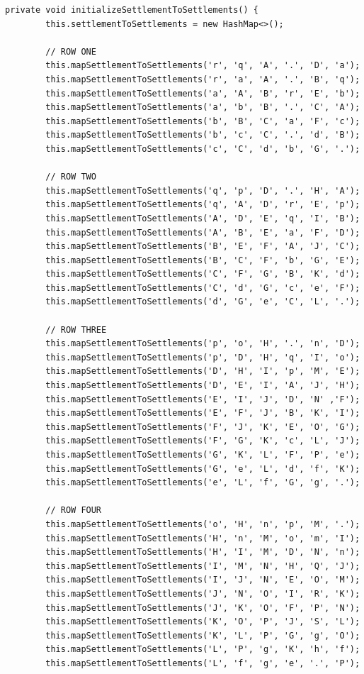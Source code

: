 \documentclass{fank1basedocument}
\begin{document}
\begin{lstlisting}[style=javacode,language=myJava]
	private void initializeSettlementToSettlements() {
		this.settlementToSettlements = new HashMap<>();

		// ROW ONE
		this.mapSettlementToSettlements('r', 'q', 'A', '.', 'D', 'a');
		this.mapSettlementToSettlements('r', 'a', 'A', '.', 'B', 'q');
		this.mapSettlementToSettlements('a', 'A', 'B', 'r', 'E', 'b');
		this.mapSettlementToSettlements('a', 'b', 'B', '.', 'C', 'A');
		this.mapSettlementToSettlements('b', 'B', 'C', 'a', 'F', 'c');
		this.mapSettlementToSettlements('b', 'c', 'C', '.', 'd', 'B');
		this.mapSettlementToSettlements('c', 'C', 'd', 'b', 'G', '.');

		// ROW TWO
		this.mapSettlementToSettlements('q', 'p', 'D', '.', 'H', 'A');
		this.mapSettlementToSettlements('q', 'A', 'D', 'r', 'E', 'p');
		this.mapSettlementToSettlements('A', 'D', 'E', 'q', 'I', 'B');
		this.mapSettlementToSettlements('A', 'B', 'E', 'a', 'F', 'D');
		this.mapSettlementToSettlements('B', 'E', 'F', 'A', 'J', 'C');
		this.mapSettlementToSettlements('B', 'C', 'F', 'b', 'G', 'E');
		this.mapSettlementToSettlements('C', 'F', 'G', 'B', 'K', 'd');
		this.mapSettlementToSettlements('C', 'd', 'G', 'c', 'e', 'F');
		this.mapSettlementToSettlements('d', 'G', 'e', 'C', 'L', '.');

		// ROW THREE
		this.mapSettlementToSettlements('p', 'o', 'H', '.', 'n', 'D');
		this.mapSettlementToSettlements('p', 'D', 'H', 'q', 'I', 'o');
		this.mapSettlementToSettlements('D', 'H', 'I', 'p', 'M', 'E');
		this.mapSettlementToSettlements('D', 'E', 'I', 'A', 'J', 'H');
		this.mapSettlementToSettlements('E', 'I', 'J', 'D', 'N' ,'F');
		this.mapSettlementToSettlements('E', 'F', 'J', 'B', 'K', 'I');
		this.mapSettlementToSettlements('F', 'J', 'K', 'E', 'O', 'G');
		this.mapSettlementToSettlements('F', 'G', 'K', 'c', 'L', 'J');
		this.mapSettlementToSettlements('G', 'K', 'L', 'F', 'P', 'e');
		this.mapSettlementToSettlements('G', 'e', 'L', 'd', 'f', 'K');
		this.mapSettlementToSettlements('e', 'L', 'f', 'G', 'g', '.');

		// ROW FOUR
		this.mapSettlementToSettlements('o', 'H', 'n', 'p', 'M', '.');
		this.mapSettlementToSettlements('H', 'n', 'M', 'o', 'm', 'I');
		this.mapSettlementToSettlements('H', 'I', 'M', 'D', 'N', 'n');
		this.mapSettlementToSettlements('I', 'M', 'N', 'H', 'Q', 'J');
		this.mapSettlementToSettlements('I', 'J', 'N', 'E', 'O', 'M');
		this.mapSettlementToSettlements('J', 'N', 'O', 'I', 'R', 'K');
		this.mapSettlementToSettlements('J', 'K', 'O', 'F', 'P', 'N');
		this.mapSettlementToSettlements('K', 'O', 'P', 'J', 'S', 'L');
		this.mapSettlementToSettlements('K', 'L', 'P', 'G', 'g', 'O');
		this.mapSettlementToSettlements('L', 'P', 'g', 'K', 'h', 'f');
		this.mapSettlementToSettlements('L', 'f', 'g', 'e', '.', 'P');


\end{lstlisting}
\end{document}

